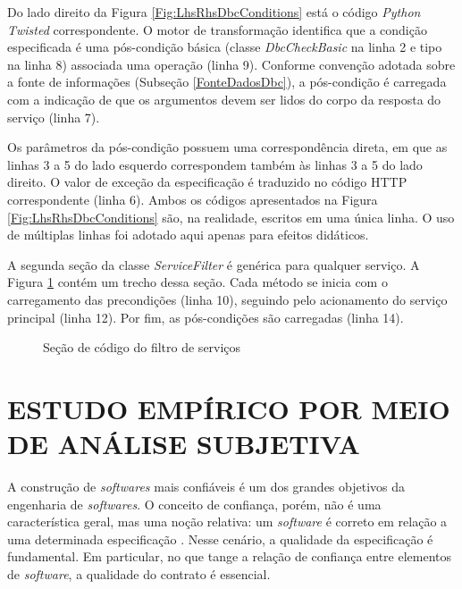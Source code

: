 Do lado direito da Figura \ref{Fig:LhsRhsDbcConditions} está o código
\emph{Python Twisted} correspondente. O motor de transformação identifica que a
condição especificada é uma pós-condição básica (classe \emph{DbcCheckBasic} na linha 2
e tipo na linha 8) associada uma operação  (linha 9). Conforme
convenção adotada sobre a fonte de informações (Subseção \ref{FonteDadosDbc}), a
pós-condição é carregada com a indicação de que os argumentos devem ser lidos do
corpo da resposta do serviço (linha 7).

Os parâmetros da pós-condição possuem uma correspondência direta, em que as
linhas 3 a 5 do lado esquerdo correspondem também às linhas 3 a 5 do lado
direito. O valor de exceção da especificação \neoidl{} é traduzido no código
HTTP correspondente (linha 6). Ambos os códigos apresentados na Figura
\ref{Fig:LhsRhsDbcConditions} são, na realidade, escritos em uma única linha.
O uso de múltiplas linhas foi adotado aqui apenas para efeitos didáticos.

A segunda seção da classe \emph{ServiceFilter} é genérica para
qualquer serviço. A Figura \ref{lst:filtrosServicosTwisted} contém um trecho
dessa seção. Cada método se inicia com o carregamento das precondições (linha
10), seguindo pelo acionamento do serviço principal (linha 12). Por fim,
as pós-condições são carregadas (linha 14).

\begin{figure}[h]
\begin{small}

\vspace{-.5cm}
\end{small} 
\caption{Seção de código do filtro de serviços}
\label{lst:filtrosServicosTwisted} 
\end{figure} 


\section{ESTUDO EMPÍRICO POR MEIO DE ANÁLISE SUBJETIVA} 
\label{analiseSubjetiva}
\vspace{-6mm}

A construção de \textit{softwares} mais confiáveis é um dos grandes objetivos da
engenharia de \textit{softwares}. O conceito de confiança, porém, não é uma
característica geral, mas uma noção relativa: um \textit{software} é correto em
relação a uma determinada especificação \cite{arnout2001net}. Nesse cenário, a
qualidade da especificação é fundamental. Em particular, no que tange a relação
de confiança entre elementos de \textit{software}, a qualidade do
contrato é essencial.

